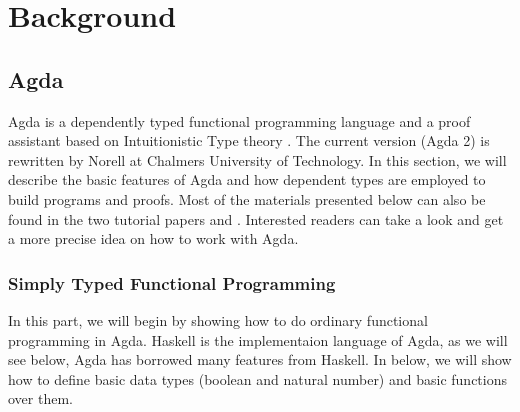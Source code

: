 \documentclass[twoside,openright,final]{bhamthesis}
\begin{document}
\newpage
\section{Background}

\subsection{Agda} 
\par Agda is a dependently typed functional programming language and a
proof assistant based on Intuitionistic Type theory
\cite{martin1984}. The current version (Agda 2) is rewritten by Norell
\cite{norell2007} at Chalmers University of
Technology. In this section, we will describe the basic features of
Agda and how dependent types are employed to build programs and
proofs. Most of the materials presented below can also be
found in the two tutorial papers \cite{bove2009} and
\cite{norell2009}. Interested readers can take a look and get
a more precise idea on how to work with Agda. 

\subsubsection{Simply Typed Functional Programming}
\par In this part, we will begin by showing how to do ordinary
functional programming in Agda. Haskell is the implementaion language
of Agda, as we will see below, Agda has borrowed many features from
Haskell. In below, we will show how to define basic data types
(boolean and natural number) and basic functions over them. 
\end{document}
